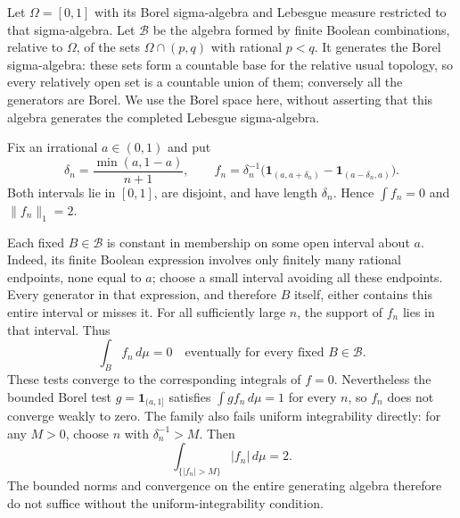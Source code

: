 \begin{example}
Let $\Omega=[0,1]$ with its Borel sigma-algebra and Lebesgue measure
restricted to that sigma-algebra. Let $\mathcal B$ be the algebra
formed by finite Boolean combinations, relative to $\Omega$, of the
sets $\Omega\cap(p,q)$ with rational $p<q$. It generates the Borel
sigma-algebra: these sets form a countable base for the relative usual
topology, so every relatively open set is a countable union of them;
conversely all the generators are Borel. We use the Borel space here,
without asserting that this algebra generates the completed Lebesgue
sigma-algebra.

Fix an irrational $a\in(0,1)$ and put
\[
\delta_n=\frac{\min(a,1-a)}{n+1},\qquad
f_n=\delta_n^{-1}
\bigl(\mathbf1_{(a,a+\delta_n)}-\mathbf1_{(a-\delta_n,a)}\bigr).
\]
Both intervals lie in $[0,1]$, are disjoint, and have length
$\delta_n$. Hence $\int f_n=0$ and $\|f_n\|_1=2$.

Each fixed $B\in\mathcal B$ is constant in membership on some open
interval about $a$. Indeed, its finite Boolean expression involves
only finitely many rational endpoints, none equal to $a$; choose a
small interval avoiding all these endpoints. Every generator in that
expression, and therefore $B$ itself, either contains this entire
interval or misses it. For all sufficiently large $n$, the support
of $f_n$ lies in that interval. Thus
\[
\int_B f_n\,d\mu=0\quad\text{eventually for every fixed }B\in\mathcal B.
\]
These tests converge to the corresponding integrals of $f=0$.
Nevertheless the bounded Borel test $g=\mathbf1_{(a,1]}$ satisfies
$\int gf_n\,d\mu=1$ for every $n$, so $f_n$ does not converge
weakly to zero. The family also fails uniform integrability directly:
for any $M>0$, choose $n$ with $\delta_n^{-1}>M$. Then
\[
\int_{\{|f_n|>M\}}|f_n|\,d\mu=2.
\]
The bounded norms and convergence on the entire generating algebra
therefore do not suffice without the uniform-integrability condition.
\end{example}

